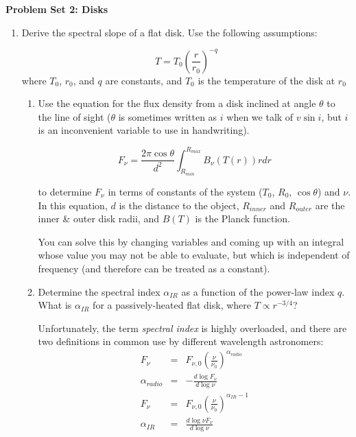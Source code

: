 \documentclass[twoside]{tufte-book} %
\begin{document}
\noindent\textbf{Problem Set 2: Disks}








\begin{enumerate}
\item
    Derive the spectral slope of a flat disk.  Use the following assumptions:

    \begin{equation}
        \label{eqn:tpower}
        T = T_0 \left(\frac{r}{r_0}\right)^{-q}
    \end{equation}
    where $T_0$, $r_0$, and $q$ are constants, and $T_0$ is the temperature of the disk at $r_0$

    \begin{enumerate}
        \item Use the equation for the flux density from a disk inclined at
            angle $\theta$ to the line of sight ($\theta$ is sometimes written
            as $i$ when we talk of $v \sin i$, but $i$ is an inconvenient
            variable to use in handwriting).

            \begin{equation}
                F_\nu = \frac{2 \pi \cos\theta}{d^2} \int_{R_{min}}^{R_{max}} B_\nu(T(r)) r dr
            \end{equation}

            to determine $F_\nu$ in terms of constants of the system ($T_0$,
            $R_0$, $\cos \theta$) and $\nu$.  In this equation, $d$ is the
            distance to the object, $R_{inner}$ and $R_{outer}$ are the inner
            \& outer disk radii, and $B(T)$ is the Planck function.  


            You can solve this by changing variables and coming up with an
            integral whose value you may not be able to evaluate, but which is
            independent of frequency (and therefore can be treated as a constant).

        \item Determine the spectral index $\alpha_{IR}$ as a function of the power-law index $q$.
            What is $\alpha_{IR}$ for a passively-heated flat disk, where $T\propto r^{-3/4}$?

            Unfortunately, the term \textit{spectral index} is highly overloaded, and there are two
            definitions in common use by different wavelength astronomers:
            \begin{eqnarray}
                F_\nu  & =&  F_{\nu,0} \left(\frac{\nu}{\nu_0}\right)^{\alpha_{radio}} \\
                \alpha_{radio} & = &  - \frac{d \log {F_\nu}}{d \log \nu}\\
                F_\nu  & =&  F_{\nu,0} \left(\frac{\nu}{\nu_0}\right)^{\alpha_{IR} - 1} \\
                \alpha_{IR} & = & \frac{d \log \nu F_\nu}{d \log \nu}
            \end{eqnarray}


\end{enumerate}
\end{enumerate}
\end{document}
